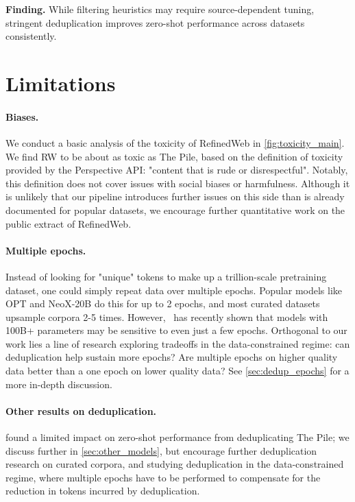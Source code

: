 \begin{mdframed}
\textbf{Finding.} While filtering heuristics may require source-dependent tuning, stringent deduplication improves zero-shot performance across datasets consistently.
\end{mdframed}

\section{Limitations}
\paragraph{Biases.} We conduct a basic analysis of the toxicity of RefinedWeb in \ref{fig:toxicity_main}. We find RW to be about as toxic as The Pile, based on the definition of toxicity provided by the Perspective API: "content that is rude or disrespectful". Notably, this definition does not cover issues with social biases or harmfulness. Although it is unlikely that our pipeline introduces further issues on this side than is already documented for popular datasets, we encourage further quantitative work on the public extract of RefinedWeb.

\paragraph{Multiple epochs.} Instead of looking for "unique" tokens to make up a trillion-scale pretraining dataset, one could simply repeat data over multiple epochs. Popular models like OPT and NeoX-20B do this for up to 2 epochs, and most curated datasets upsample corpora 2-5 times. However,~\citet{hernandez2022scaling} has recently shown that models with 100B+ parameters may be sensitive to even just a few epochs. Orthogonal to our work lies a line of research exploring tradeoffs in the data-constrained regime: can deduplication help sustain more epochs? Are multiple epochs on higher quality data better than a one epoch on lower quality data? See \ref{sec:dedup_epochs} for a more in-depth discussion.

\paragraph{Other results on deduplication.} \citet{biderman2023pythia} found a limited impact on zero-shot performance from deduplicating The Pile; we discuss further in \ref{sec:other_models}, but encourage further deduplication research on curated corpora, and studying deduplication in the data-constrained regime, where multiple epochs have to be performed to compensate for the reduction in tokens incurred by deduplication.

